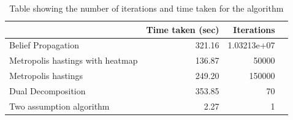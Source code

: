 \documentclass[10pt,oneside,letterpaper]{article}
\begin{document}
\begin{table}
  \begin{tabular}{|l|r|r|r|}
    \hline
                                     & Time taken (sec) & Iterations \\
    \hline
    Belief Propagation               & 321.16           & 1.03213e+07\\
    Metropolis hastings with heatmap & 136.87           & 50000\\
                  Metropolis hastings& 249.20           & 150000\\
    Dual Decomposition               & 353.85           & 70\\
    Two assumption algorithm         & 2.27             & 1\\
    \hline
  \end{tabular}
  \caption{Table showing the number of iterations and time taken for the algorithm}
  \label{tab:convergencetime}
\end{table}





\end{document}
